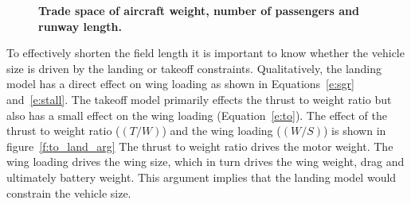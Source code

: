 \documentclass[]{aiaa-tc}%
\begin{document}
\begin{figure}[h!]
 \begin{subfigmatrix}{2}%
 \end{subfigmatrix}
    \caption{\textbf{Trade space of aircraft weight, number of passengers and runway length.}}
 \label{f:sw_mt}
\end{figure}

To effectively shorten the field length it is important to know whether the vehicle size is driven by the landing or takeoff constraints. 
Qualitatively, the landing model has a direct effect on wing loading as shown in Equations~\ref{e:sgr} and~\ref{e:stall}.  
The takeoff model primarily effects the thrust to weight ratio but also has a small effect on the wing loading (Equation~\ref{e:to}). 
The effect of the thrust to weight ratio ($(T/W)$) and the wing loading ($(W/S)$) is shown in figure~\ref{f:to_land_arg}
The thrust to weight ratio drives the motor weight.  
The wing loading drives the wing size, which in turn drives the wing weight, drag and ultimately battery weight.  
This argument implies that the landing model would constrain the vehicle size. 
\end{document}
